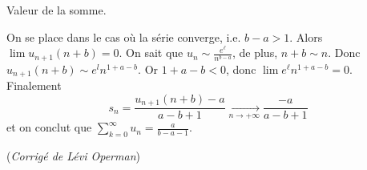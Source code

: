 {{Valeur de la somme.

 
On se place dans le cas où la série converge, i.e. $b-a>1$. Alors $\lim u_{n+1}(n+b) = 0$.
On sait que $u_n\sim\frac{e^\ell}{n^{b-a}}$, de plus, $n+b\sim n$.
Donc $u_{n+1}(n+b)\sim e^ln^{1+a-b}$. Or $1 + a - b < 0$, donc $\lim e^\ell n^{1+a-b} = 0$.
Finalement
\[
s_n = \frac{u_{n+1}(n+b)-a}{a-b+1} \xrightarrow[n \to +\infty]{}
\frac{-a}{a-b+1}
\]
et on conclut que $\sum_{k=0}^\infty{u_n} = \frac{a}{b-a-1}$.

\medskip

(\emph{Corrigé de Lévi Operman})}
}